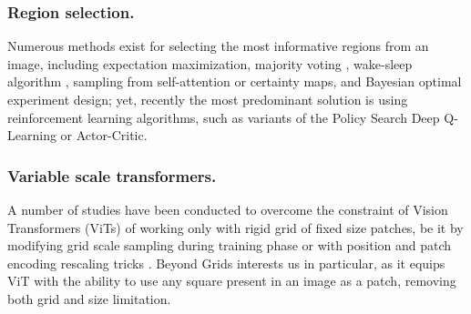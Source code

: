 \documentclass[runningheads]{llncs}
\def\maciek#1{{\textbf{\color{blue}{Maciek[{#1}]}}}}
\begin{document}
\subsubsection{Region selection.}
Numerous methods exist for selecting the most informative regions from an image, including expectation maximization\cite{ranzato2014learning,yoo2015attentionnet}, majority voting \cite{alexe2012searching}, wake-sleep algorithm \cite{ba2015learning}, sampling from self-attention or certainty maps\cite{seifi2021glimpse,seifi2020attend,pardyl2023active}, and Bayesian optimal experiment design\cite{rangrej2021probabilistic}; 
yet, recently the most predominant solution is using reinforcement learning algorithms, such as variants of the Policy Search\cite{xu2015show,mnih2014recurrent,mathe2016reinforcement} %
Deep Q-Learning\cite{caicedo2015active,chai2019patchwork} or Actor-Critic\cite{rangrej2022consistency}.  

\subsubsection{Variable scale transformers.}
A number of studies have been conducted to overcome the constraint of Vision Transformers (ViTs) of working only with rigid grid of fixed size patches, be it by modifying grid scale sampling during training phase\cite{li2021efficient,touvron2022deit,wu2020multigrid} or with position and patch encoding rescaling tricks \cite{beyer2022flexivit}. 
Beyond Grids\cite{pardyl2023beyond} interests us in particular, as it equips ViT with the ability to use any square present in an image as a patch, removing both grid and size limitation.
\end{document}
